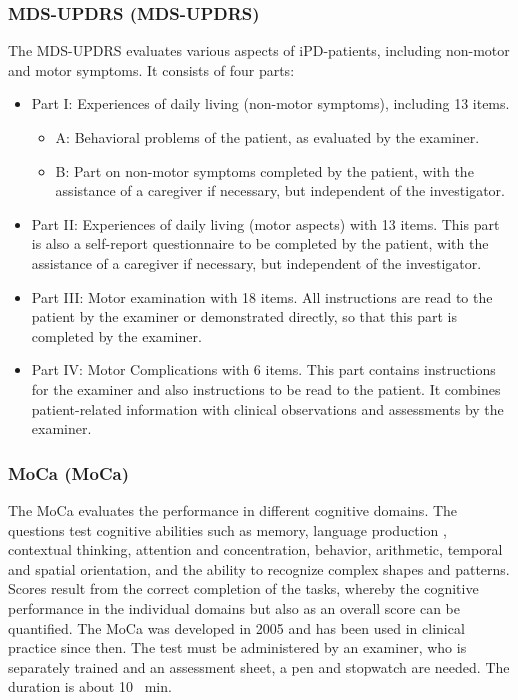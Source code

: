 \subsubsection{\acl{MDS-UPDRS} (\acs{MDS-UPDRS})}
\label{questionnaires:updrs}
The \ac{MDS-UPDRS} \cite{goetz2007updrs} evaluates various aspects of \ac{iPD}-patients, including non-motor and motor symptoms. It consists of four parts:
\begin{itemize}
\item Part I: Experiences of daily living (non-motor symptoms), including 13 items.
\begin{itemize}
\item A: Behavioral problems of the patient, as evaluated by the examiner.
\item B: Part on non-motor symptoms completed by the patient, with the assistance of a caregiver if necessary, but independent of the investigator.
\end{itemize}
\item Part II: Experiences of daily living (motor aspects) with 13 items. This part is also a self-report questionnaire to be completed by the patient, with the assistance of a caregiver if necessary, but independent of the investigator.
\item Part III: Motor examination with 18 items. All instructions are read to the patient by the examiner or demonstrated directly, so that this part is completed by the examiner.
\item Part IV: Motor Complications with 6 items. This part contains instructions for the examiner and also instructions to be read to the patient. It combines patient-related information with clinical observations and assessments by the examiner.
\end{itemize}

\subsubsection{\acl{MoCa} (\acs{MoCa})}
\label{questionnaires:MoCa}
The \acl{MoCa} evaluates the performance in different cognitive domains. The questions test cognitive abilities such as memory, language production , contextual thinking, attention and concentration, behavior, arithmetic, temporal and spatial orientation, and the ability to recognize complex shapes and patterns. Scores result from the correct completion of the tasks, whereby the cognitive performance in the individual domains but also as an overall score can be quantified. The \ac{MoCa} was developed in 2005 \cite{nasreddine2005moca} and has been used in clinical practice since then. The test must be administered by an examiner, who is separately trained and an assessment sheet, a pen and stopwatch are needed. The duration is about \num[round-precision = 0, round-mode=places]{10} \SI{}{\minute}.

